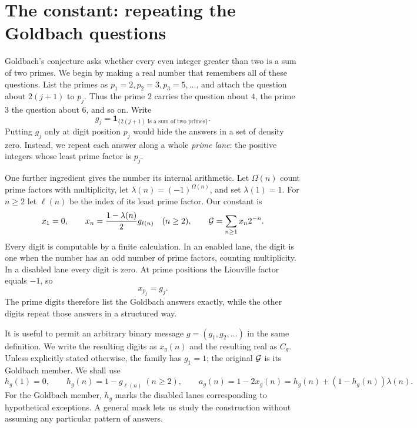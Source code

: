 \section{The constant: repeating the Goldbach questions}
\label{fnd:constant}

Goldbach's conjecture asks whether every even integer greater than two is a
sum of two primes.  We begin by making a real number that remembers all of
these questions.  List the primes as $p_1=2,p_2=3,p_3=5,\ldots$, and attach
the question about $2(j+1)$ to $p_j$.  Thus the prime $2$ carries the question
about $4$, the prime $3$ the question about $6$, and so on.  Write
\[
 g_j=\mathbf1_{\{2(j+1)\text{ is a sum of two primes}\}}.
\]
Putting $g_j$ only at digit position $p_j$ would hide the answers in a set
of density zero.  Instead, we repeat each answer along a whole
\emph{prime lane}: the positive integers whose least prime factor is $p_j$.

One further ingredient gives the number its internal arithmetic.  Let
$\Omega(n)$ count prime factors with multiplicity, let
$\lambda(n)=(-1)^{\Omega(n)}$, and set $\lambda(1)=1$.  For $n\ge2$ let
$\ell(n)$ be the index of its least prime factor.  Our constant is
\begin{equation}
 x_1=0,\qquad x_n=\frac{1-\lambda(n)}2g_{\ell(n)}\quad(n\ge2),
 \qquad \mathcal G=\sum_{n\ge1}x_n2^{-n}.
 \label{fnd:definition}
\end{equation}
Every digit is computable by a finite calculation.  In an enabled lane,
the digit is one when the number has an odd number of prime factors,
counting multiplicity.  In a disabled lane every digit is zero.
At prime positions the Liouville factor equals $-1$, so
\begin{equation}
 x_{p_j}=g_j.
 \label{fnd:prime-reading}
\end{equation}
The prime digits therefore list the Goldbach answers exactly, while the
other digits repeat those answers in a structured way.

It is useful to permit an arbitrary binary message
$g=(g_1,g_2,\ldots)$ in the same definition.  We write the resulting
digits as $x_g(n)$ and the resulting real as $C_g$.  Unless explicitly
stated otherwise, the family has $g_1=1$; the original $\mathcal G$ is its
Goldbach member.  We shall use
\begin{equation}
 h_g(1)=0,\qquad h_g(n)=1-g_{\ell(n)}\ (n\ge2),\qquad
 a_g(n)=1-2x_g(n)=h_g(n)+(1-h_g(n))\lambda(n).
 \label{fnd:mask}
\end{equation}
For the Goldbach member, $h_g$ marks the disabled lanes corresponding to
hypothetical exceptions.  A general mask lets us study the construction
without assuming any particular pattern of answers.

